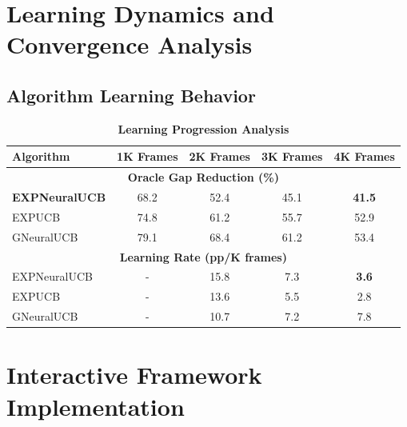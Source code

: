 \documentclass[11pt,a4paper]{article}
\newcommand{\performance}[1]{\textcolor{performancecolor}{\textbf{#1}}}
\begin{document}
\section{Learning Dynamics and Convergence Analysis}

\subsection{Algorithm Learning Behavior}

\begin{table}[H]
\centering
\caption{\performance{Learning Progression Analysis}}
\begin{tabular}{|l|c|c|c|c|}
\hline
\textbf{Algorithm} & \textbf{1K Frames} & \textbf{2K Frames} & \textbf{3K Frames} & \textbf{4K Frames} \\
\hline
\hline
\multicolumn{5}{|c|}{\textbf{Oracle Gap Reduction (\%)}} \\
\hline
\performance{EXPNeuralUCB} & 68.2 & 52.4 & 45.1 & \performance{41.5} \\
EXPUCB & 74.8 & 61.2 & 55.7 & 52.9 \\
GNeuralUCB & 79.1 & 68.4 & 61.2 & 53.4 \\
\hline
\multicolumn{5}{|c|}{\textbf{Learning Rate (pp/K frames)}} \\
\hline
EXPNeuralUCB & - & 15.8 & 7.3 & \performance{3.6} \\
EXPUCB & - & 13.6 & 5.5 & 2.8 \\
GNeuralUCB & - & 10.7 & 7.2 & 7.8 \\
\hline
\end{tabular}
\end{table}

\section{Interactive Framework Implementation}
\end{document}
